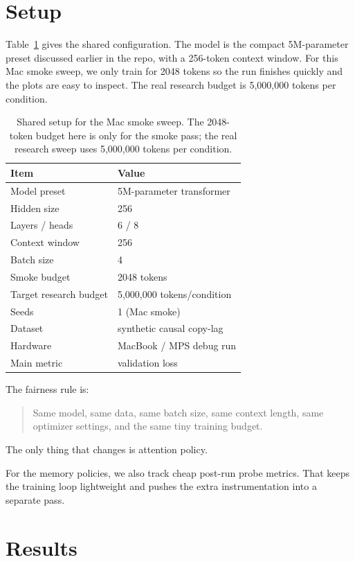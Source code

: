 \documentclass[10pt,twocolumn]{article}
\begin{document}
\section{Setup}

Table~\ref{tab:setup} gives the shared configuration. The model is the
compact 5M-parameter preset discussed earlier in the repo, with a 256-token
context window. For this Mac smoke sweep, we only train for 2048 tokens so the
run finishes quickly and the plots are easy to inspect. The real research
budget is 5,000,000 tokens per condition.

\begin{table}[t]
\centering
\small
\caption{Shared setup for the Mac smoke sweep. The 2048-token budget here is
only for the smoke pass; the real research sweep uses 5,000,000 tokens per
condition.}
\label{tab:setup}
\begin{tabular}{@{}ll@{}}
\toprule
Item & Value \\
\midrule
Model preset & 5M-parameter transformer \\
Hidden size & 256 \\
Layers / heads & 6 / 8 \\
Context window & 256 \\
Batch size & 4 \\
Smoke budget & 2048 tokens \\
Target research budget & 5,000,000 tokens/condition \\
Seeds & 1 (Mac smoke) \\
Dataset & synthetic causal copy-lag \\
Hardware & MacBook / MPS debug run \\
Main metric & validation loss \\
\bottomrule
\end{tabular}
\end{table}

The fairness rule is:

\begin{quote}
Same model, same data, same batch size, same context length, same optimizer
settings, and the same tiny training budget.
\end{quote}

The only thing that changes is attention policy.

For the memory policies, we also track cheap post-run probe metrics. That keeps
the training loop lightweight and pushes the extra instrumentation into a
separate pass.

\section{Results}
\end{document}
